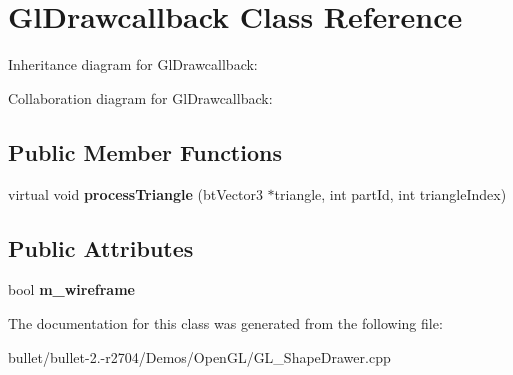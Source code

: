 \hypertarget{class_gl_drawcallback}{\section{Gl\+Drawcallback Class Reference}
\label{class_gl_drawcallback}
}


Inheritance diagram for Gl\+Drawcallback\+:


Collaboration diagram for Gl\+Drawcallback\+:
\subsection*{Public Member Functions}
\begin{DoxyCompactItemize}
\item 
\hypertarget{class_gl_drawcallback_a04c3084faccba65b65b9679594e7a046}{virtual void {\bfseries process\+Triangle} (bt\+Vector3 $\ast$triangle, int part\+Id, int triangle\+Index)}\label{class_gl_drawcallback_a04c3084faccba65b65b9679594e7a046}

\end{DoxyCompactItemize}
\subsection*{Public Attributes}
\begin{DoxyCompactItemize}
\item 
\hypertarget{class_gl_drawcallback_af7544ee06c8018ad0641f291b7605939}{bool {\bfseries m\+\_\+wireframe}}\label{class_gl_drawcallback_af7544ee06c8018ad0641f291b7605939}

\end{DoxyCompactItemize}


The documentation for this class was generated from the following file\+:\begin{DoxyCompactItemize}
\item 
bullet/bullet-\/2.-\/r2704/\+Demos/\+Open\+G\+L/G\+L\+\_\+\+Shape\+Drawer.\+cpp\end{DoxyCompactItemize}
